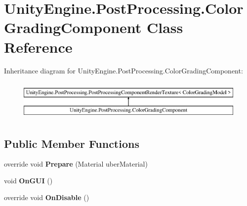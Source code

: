 \hypertarget{class_unity_engine_1_1_post_processing_1_1_color_grading_component}{}\section{Unity\+Engine.\+Post\+Processing.\+Color\+Grading\+Component Class Reference}
\label{class_unity_engine_1_1_post_processing_1_1_color_grading_component}
Inheritance diagram for Unity\+Engine.\+Post\+Processing.\+Color\+Grading\+Component\+:\begin{figure}[H]
\begin{center}
\leavevmode
\includegraphics[height=2.000000cm]{class_unity_engine_1_1_post_processing_1_1_color_grading_component}
\end{center}
\end{figure}
\subsection*{Public Member Functions}
\begin{DoxyCompactItemize}
\item 
\mbox{\label{class_unity_engine_1_1_post_processing_1_1_color_grading_component_a6028831311ad34f0f563fa5715c139dc}} 
override void {\bfseries Prepare} (Material uber\+Material)
\item 
\mbox{\label{class_unity_engine_1_1_post_processing_1_1_color_grading_component_abf942f421fab142504cd5be46b804815}} 
void {\bfseries On\+G\+UI} ()
\item 
\mbox{\label{class_unity_engine_1_1_post_processing_1_1_color_grading_component_a888398f3d7e4eeb2809dd9f66b185622}} 
override void {\bfseries On\+Disable} ()
\end{DoxyCompactItemize}
